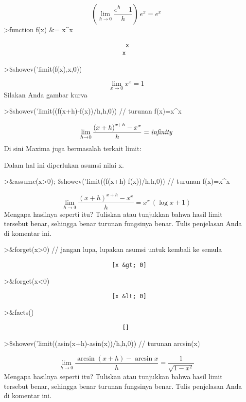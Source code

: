 \documentclass[
]{book}
\begin{document}
\[\left(\lim_{h\rightarrow 0}{\frac{e^{h}-1}{h}}\right)\,e^{x}=e^{x}\]\textgreater function f(x) \&= x\^{}x

\begin{verbatim}
                                   x
                                  x
\end{verbatim}

\textgreater\$showev('limit(f(x),x,0))

\[\lim_{x\rightarrow 0}{x^{x}}=1\]Silakan Anda gambar kurva

\textgreater\$showev('limit((f(x+h)-f(x))/h,h,0)) // turunan f(x)=x\^{}x

\[\lim_{h\rightarrow 0}{\frac{\left(x+h\right)^{x+h}-x^{x}}{h}}=  {\it infinity}\]Di sini Maxima juga bermasalah terkait limit:

Dalam hal ini diperlukan asumsi nilai x.

\textgreater\&assume(x\textgreater0); \$showev('limit((f(x+h)-f(x))/h,h,0)) // turunan f(x)=x\^{}x

\[\lim_{h\rightarrow 0}{\frac{\left(x+h\right)^{x+h}-x^{x}}{h}}=x^{x}  \,\left(\log x+1\right)\]Mengapa hasilnya seperti itu? Tuliskan atau tunjukkan bahwa hasil limit tersebut benar, sehingga benar turunan fungsinya benar. Tulis penjelasan Anda di komentar ini.

\textgreater\&forget(x\textgreater0) // jangan lupa, lupakan asumsi untuk kembali ke semula

\begin{verbatim}
                               [x &gt; 0]
\end{verbatim}

\textgreater\&forget(x\textless0)

\begin{verbatim}
                               [x &lt; 0]
\end{verbatim}

\textgreater\&facts()

\begin{verbatim}
                                  []
\end{verbatim}

\textgreater\$showev('limit((asin(x+h)-asin(x))/h,h,0)) // turunan arcsin(x)

\[\lim_{h\rightarrow 0}{\frac{\arcsin \left(x+h\right)-\arcsin x}{h}}=  \frac{1}{\sqrt{1-x^2}}\]Mengapa hasilnya seperti itu? Tuliskan atau tunjukkan bahwa hasil limit tersebut benar, sehingga benar turunan fungsinya benar. Tulis penjelasan Anda di komentar ini.
\end{document}
